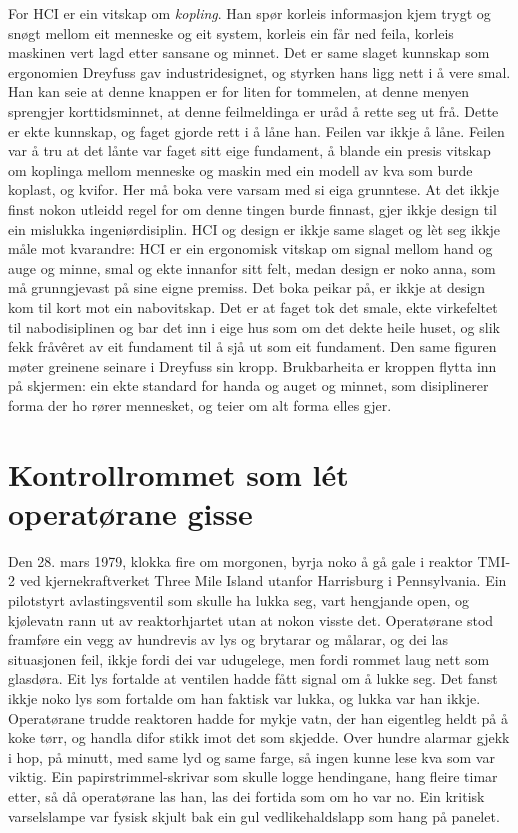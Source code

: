 For HCI er ein vitskap om \emph{kopling}. Han spør korleis informasjon kjem trygt og snøgt mellom eit menneske og eit system, korleis ein får ned feila, korleis maskinen vert lagd etter sansane og minnet. Det er same slaget kunnskap som ergonomien Dreyfuss gav industridesignet, og styrken hans ligg nett i å vere smal. Han kan seie at denne knappen er for liten for tommelen, at denne menyen sprengjer korttidsminnet, at denne feilmeldinga er uråd å rette seg ut frå. Dette er ekte kunnskap, og faget gjorde rett i å låne han. Feilen var ikkje å låne. Feilen var å tru at det lånte var faget sitt eige fundament, å blande ein presis vitskap om koplinga mellom menneske og maskin med ein modell av kva som burde koplast, og kvifor. Her må boka vere varsam med si eiga grunntese. At det ikkje finst nokon utleidd regel for om denne tingen burde finnast, gjer ikkje design til ein mislukka ingeniørdisiplin. HCI og design er ikkje same slaget og lèt seg ikkje måle mot kvarandre: HCI er ein ergonomisk vitskap om signal mellom hand og auge og minne, smal og ekte innanfor sitt felt, medan design er noko anna, som må grunngjevast på sine eigne premiss. Det boka peikar på, er ikkje at design kom til kort mot ein nabovitskap. Det er at faget tok det smale, ekte virkefeltet til nabodisiplinen og bar det inn i eige hus som om det dekte heile huset, og slik fekk fråvêret av eit fundament til å sjå ut som eit fundament. Den same figuren møter greinene seinare i Dreyfuss sin kropp. Brukbarheita er kroppen flytta inn på skjermen: ein ekte standard for handa og auget og minnet, som disiplinerer forma der ho rører mennesket, og teier om alt forma elles gjer.

\section{Kontrollrommet som lét operatørane gisse}

Den 28. mars 1979, klokka fire om morgonen, byrja noko å gå gale i reaktor TMI-2 ved kjernekraftverket Three Mile Island utanfor Harrisburg i Pennsylvania. Ein pilotstyrt avlastingsventil som skulle ha lukka seg, vart hengjande open, og kjølevatn rann ut av reaktorhjartet utan at nokon visste det. Operatørane stod framføre ein vegg av hundrevis av lys og brytarar og målarar, og dei las situasjonen feil, ikkje fordi dei var udugelege, men fordi rommet laug nett som glasdøra. Eit lys fortalde at ventilen hadde fått signal om å lukke seg. Det fanst ikkje noko lys som fortalde om han faktisk var lukka, og lukka var han ikkje. Operatørane trudde reaktoren hadde for mykje vatn, der han eigentleg heldt på å koke tørr, og handla difor stikk imot det som skjedde. Over hundre alarmar gjekk i hop, på minutt, med same lyd og same farge, så ingen kunne lese kva som var viktig. Ein papirstrimmel-skrivar som skulle logge hendingane, hang fleire timar etter, så då operatørane las han, las dei fortida som om ho var no. Ein kritisk varselslampe var fysisk skjult bak ein gul vedlikehaldslapp som hang på panelet.

